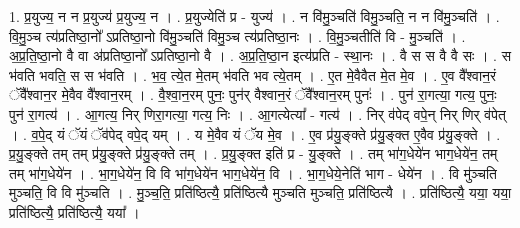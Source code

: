 \documentclass[17pt]{extarticle}
\begin{document}
1. प्र॒युज्य॒ न न प्र॒युज्य॑ प्र॒युज्य॒ न । . प्र॒युज्येति॑ प्र - युज्य॑ । . न वि॑मु॒ञ्चति॑ विमु॒ञ्चति॒ न न वि॑मु॒ञ्चति॑ । . वि॒मु॒ञ्च त्य॑प्रतिष्ठा॒नो᳚ ऽप्रतिष्ठा॒नो वि॑मु॒ञ्चति॑ विमु॒ञ्च त्य॑प्रतिष्ठा॒नः । . वि॒मु॒ञ्चतीति॑ वि - मु॒ञ्चति॑ । . अ॒प्र॒ति॒ष्ठा॒नो वै वा अ॑प्रतिष्ठा॒नो᳚ ऽप्रतिष्ठा॒नो वै । . अ॒प्र॒ति॒ष्ठा॒न इत्य॑प्रति - स्था॒नः । . वै स स वै वै सः । . स भ॑वति भवति॒ स स भ॑वति । . भ॒व॒ त्ये॒त मे॒तम् भ॑वति भव त्ये॒तम् । . ए॒त मे॒वैवैत मे॒त मे॒व । . ए॒व वै᳚श्वान॒रं ॅवै᳚श्वान॒र मे॒वैव वै᳚श्वान॒रम् । . वै॒श्वा॒न॒रम् पुनः॒ पुन॑र् वैश्वान॒रं ॅवै᳚श्वान॒रम् पुनः॑ । . पुन॑ रा॒गत्या॒ गत्य॒ पुनः॒ पुन॑ रा॒गत्य॑ । . आ॒गत्य॒ निर् णिरा॒गत्या॒ गत्य॒ निः । . आ॒गत्येत्या᳚ - गत्य॑ । . निर् व॑पेद् वपे॒न् निर् णिर् व॑पेत् । . व॒पे॒द् यं ॅयं ॅव॑पेद् वपे॒द् यम् । . य मे॒वैव यं ॅय मे॒व । . ए॒व प्र॑यु॒ङ्क्ते प्र॑यु॒ङ्क्त ए॒वैव प्र॑यु॒ङ्क्ते । . प्र॒यु॒ङ्क्ते तम् तम् प्र॑यु॒ङ्क्ते प्र॑यु॒ङ्क्ते तम् । . प्र॒यु॒ङ्क्त इति॑ प्र - यु॒ङ्क्ते । . तम् भा॑ग॒धेये॑न भाग॒धेये॑न॒ तम् तम् भा॑ग॒धेये॑न । . भा॒ग॒धेये॑न॒ वि वि भा॑ग॒धेये॑न भाग॒धेये॑न॒ वि । . भा॒ग॒धेये॒नेति॑ भाग - धेये॑न । . वि मु॑ञ्चति मुञ्चति॒ वि वि मु॑ञ्चति । . मु॒ञ्च॒ति॒ प्रति॑ष्ठित्यै॒ प्रति॑ष्ठित्यै मुञ्चति मुञ्चति॒ प्रति॑ष्ठित्यै । . प्रति॑ष्ठित्यै॒ यया॒ यया॒ प्रति॑ष्ठित्यै॒ प्रति॑ष्ठित्यै॒ यया᳚ । \newline
\end{document}
